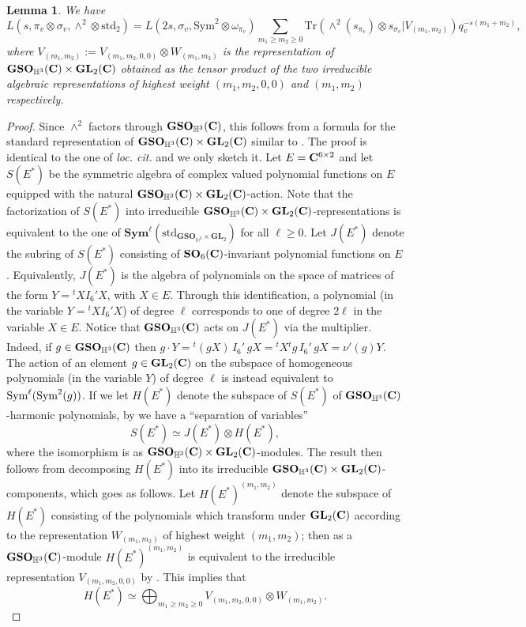 \documentclass[11pt, reqno]{amsart}
\theoremstyle{plain}
\newtheorem{lemma}[theorem]{Lemma}
\theoremstyle{definition}
\theoremstyle{remark}
\theoremstyle{plain}
\def\C{{\bf C}}
\def\SO{{\mathbf{SO}}}
\def\GSO{{\mathbf{GSO}}}
\def\GL{\mathbf{GL}}
\begin{document}
\begin{lemma}\label{LfunctionFactSplit}
We have
\[L(s,\pi_v \otimes \sigma_v, \wedge^2 \otimes \mathrm{std}_2) = L(2s,\sigma_v,\mathrm{Sym}^2\otimes\omega_{\pi_v}) \sum_{m_1\geq m_2\geq 0}\mathrm{Tr}\left(\wedge^2(s_{\pi_v})\otimes s_{\sigma_v}|V_{(m_1,m_2)}\right)q_v^{-s (m_1+m_2)},\]
where $V_{(m_1,m_2)} := V_{(m_1,m_2,0,0)}\otimes W_{(m_1,m_2)}$ is the representation of $\GSO_{\mathbb{H}^3}(\C)\times \GL_2(\C)$ obtained as the tensor product of the two irreducible algebraic representations of highest weight $(m_1,m_2,0,0)$ and $(m_1,m_2)$ respectively.
\end{lemma}
\begin{proof}
    Since $\wedge^2$ factors through $\GSO_{\mathbb{H}^3}(\C)$, this follows from a formula for the standard representation of $\GSO_{\mathbb{H}^3}(\C) \times \GL_2(\C)$ similar to \cite[(A.2.1)]{ExplicitGSR}. The proof is identical to the one of \emph{loc. cit.} and we only sketch it. Let $E = \C^{6 \times 2}$ and let $S(E^*)$ be the symmetric algebra of complex valued polynomial functions on $E$ equipped with the natural $\GSO_{\mathbb{H}^3}(\C)\times \GL_2(\C) $-action. Note that the factorization of $S(E^*)$ into irreducible $\GSO_{\mathbb{H}^3}(\C)\times \GL_2(\C) $-representations is equivalent to the one of $\mathbf{Sym}^\ell(\mathrm{std}_{\GSO_{\mathbb{H}^3}\times\GL_2})$ for all $\ell \geq 0$. Let $J(E^*)$ denote the subring of $S(E^*)$ consisting of $\SO_6(\C)$-invariant polynomial functions on $E$. Equivalently, $J(E^*)$ is the algebra of polynomials on the space of matrices of the form $Y={}^tX I_6' X$, with $X \in E$. Through this identification, a polynomial (in the variable $Y={}^tX I_6' X$) of degree $\ell$ corresponds to one of degree $2 \ell$ in the variable $X \in E$. Notice that $\GSO_{\mathbb{H}^3}(\C)$ acts on $J(E^*)$ via the multiplier. Indeed, if $g \in \GSO_{\mathbb{H}^3}(\C)$ then $g \cdot Y = {}^t(gX) \,I_6'\, gX=  {}^tX{}^tg\,I_6'\, gX= \nu'(g) Y$. The action of an element $g \in \GL_2(\C)$ on the subspace of homogeneous polynomials (in the variable $Y$) of degree $\ell$ is instead equivalent to ${\rm Sym}^\ell({\rm Sym}^2(g))$. If we let $H(E^*)$ denote the subspace of $S(E^*)$ of $\GSO_{\mathbb{H}^3}(\C)$-harmonic polynomials, by \cite[Theorem 2.5]{Ton-That} we have a ``separation of variables'' \[S(E^*) \simeq J(E^*) \otimes  H(E^*),\]
    where the isomorphism is as $ \GSO_{\mathbb{H}^3}(\C) \times \GL_2(\C)$-modules. The result then follows from decomposing $H(E^*)$ into its irreducible $ \GSO_{\mathbb{H}^3}(\C) \times \GL_2(\C)$-components, which goes as follows. Let $H(E^*)^{(m_1,m_2)}$ denote the subspace of $H(E^*)$ consisting of the polynomials which transform under $\GL_2(\C)$ according to the representation $W_{(m_1,m_2)}$ of highest weight $(m_1,m_2)$; then as a $\GSO_{\mathbb{H}^3}(\C)$-module $H(E^*)^{(m_1,m_2)}$ is equivalent to the irreducible representation $V_{(m_1,m_2,0,0)}$ by \cite[Theorem 3.1]{Ton-That}. This implies that \[ H(E^*) \simeq \bigoplus_{m_1 \geq m_2 \geq 0} V_{(m_1,m_2,0,0)} \otimes W_{(m_1,m_2)}. \] 

\end{proof}
\end{document}
